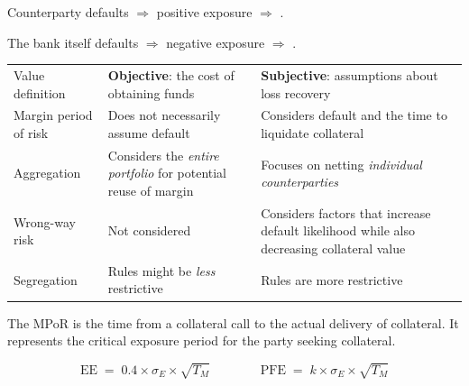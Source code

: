 
\begin{crkeybox}
Counterparty defaults $\Rightarrow$ positive exposure $\Rightarrow$ .

\smallskip
The bank itself defaults $\Rightarrow$ negative exposure $\Rightarrow$
.
\end{crkeybox}

\begin{center}
\footnotesize
\begin{tabular}{L{2.7cm} L{5.6cm} L{6.2cm}}
\toprule
 &  &  \\
\midrule
Value definition & \textbf{Objective}: the cost of obtaining funds &
  \textbf{Subjective}: assumptions about loss recovery \\
Margin period of risk & Does not necessarily assume default &
  Considers default and the time to liquidate collateral \\
Aggregation & Considers the \emph{entire portfolio} for potential reuse of margin &
  Focuses on netting \emph{individual counterparties} \\
Wrong-way risk & Not considered &
  Considers factors that increase default likelihood while also decreasing
  collateral value \\
Segregation & Rules might be \emph{less} restrictive &
  Rules are more restrictive \\
\bottomrule
\end{tabular}
\end{center}


\begin{crdefbox}
The MPoR is the time from a collateral call to the actual delivery of collateral.
It represents the critical exposure period for the party seeking collateral.
\end{crdefbox}

\begin{crfmlbox}
\[ \mathrm{EE} \;=\; 0.4 \times \sigma_E \times \sqrt{T_M}
   \qquad\qquad
   \mathrm{PFE} \;=\; k \times \sigma_E \times \sqrt{T_M} \]
\end{crfmlbox}


